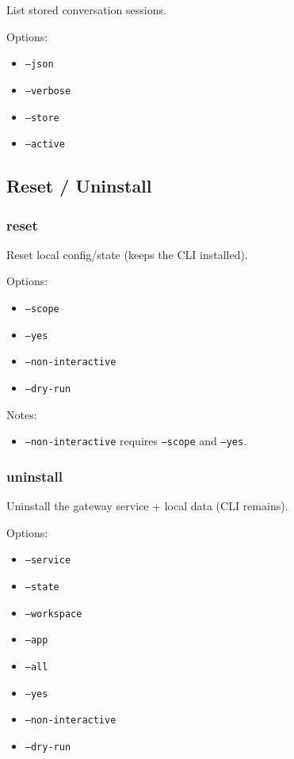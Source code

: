 List stored conversation sessions.

Options:

\begin{itemize}
  \item \texttt{--json}
  \item \texttt{--verbose}
  \item \texttt{--store }
  \item \texttt{--active }
\end{itemize}


\subsection{Reset / Uninstall}


\subsubsection{reset}


Reset local config/state (keeps the CLI installed).

Options:

\begin{itemize}
  \item \texttt{--scope }
  \item \texttt{--yes}
  \item \texttt{--non-interactive}
  \item \texttt{--dry-run}
\end{itemize}


Notes:

\begin{itemize}
  \item \texttt{--non-interactive} requires \texttt{--scope} and \texttt{--yes}.
\end{itemize}


\subsubsection{uninstall}


Uninstall the gateway service + local data (CLI remains).

Options:

\begin{itemize}
  \item \texttt{--service}
  \item \texttt{--state}
  \item \texttt{--workspace}
  \item \texttt{--app}
  \item \texttt{--all}
  \item \texttt{--yes}
  \item \texttt{--non-interactive}
  \item \texttt{--dry-run}
\end{itemize}


